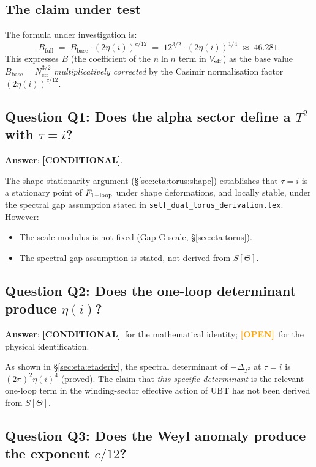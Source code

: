 \documentclass[12pt,a4paper]{article}
\theoremstyle{definition}
\theoremstyle{remark}
\newcommand{\CONDITIONAL}{\textcolor{blue!70!black}{\textbf{[CONDITIONAL]}}}
\newcommand{\OPEN}{\textcolor{orange}{\textbf{[OPEN]}}}
\newcommand{\Neff}{N_{\mathrm{eff}}}
\newcommand{\Bbase}{B_{\mathrm{base}}}
\newcommand{\Bfull}{B_{\mathrm{full}}}
\begin{document}
\subsection{The claim under test}

The formula under investigation is:
\begin{equation}\label{eq:Bfull}
  \Bfull \;=\; \Bbase\cdot(2\eta(i))^{c/12}
  \;=\; 12^{3/2}\cdot(2\eta(i))^{1/4}
  \;\approx\; 46.281.
\end{equation}
This expresses $B$ (the coefficient of the $n\ln n$ term in $V_{\rm eff}$)
as the base value $\Bbase = \Neff^{3/2}$ \emph{multiplicatively corrected}
by the Casimir normalisation factor $(2\eta(i))^{c/12}$.

\subsection{Question Q1: Does the alpha sector define a $T^2$ with $\tau = i$?}
\label{sec:q1}

\noindent\textbf{Answer}: \CONDITIONAL.

The shape-stationarity argument (§\ref{sec:eta:torus:shape}) establishes
that $\tau = i$ is a stationary point of $F_{\rm 1-loop}$ under shape
deformations, and locally stable, under the spectral gap assumption stated
in \texttt{self\_dual\_torus\_derivation.tex}.  However:
\begin{itemize}
  \item The scale modulus is not fixed (Gap G-scale, §\ref{sec:eta:torus}).
  \item The spectral gap assumption is stated, not derived from $S[\Theta]$.
\end{itemize}

\subsection{Question Q2: Does the one-loop determinant produce $\eta(i)$?}
\label{sec:q2}

\noindent\textbf{Answer}: \CONDITIONAL\ for the mathematical identity; \OPEN\
for the physical identification.

As shown in §\ref{sec:eta:etaderiv}, the spectral determinant of $-\Delta_{T^2}$
at $\tau = i$ is $(2\pi)^2\eta(i)^4$ (proved).  The claim that \emph{this
specific determinant} is the relevant one-loop term in the winding-sector
effective action of UBT has not been derived from $S[\Theta]$.

\subsection{Question Q3: Does the Weyl anomaly produce the exponent $c/12$?}
\label{sec:q3}
\end{document}
